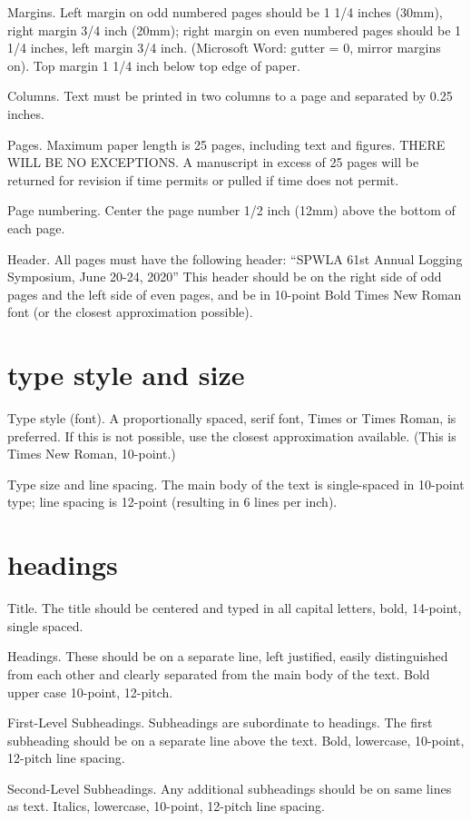 \documentclass[10pt,twocolumn,twoside]{article}
\begin{document}
Margins. Left margin on odd numbered pages should be 1 1/4 inches (30mm), right margin 3/4 inch (20mm); right margin on even numbered pages should be 1 1/4 inches, left margin 3/4 inch. (Microsoft Word: gutter = 0, mirror margins on). Top margin 1 1/4 inch below top edge of paper.

Columns. Text must be printed in two columns to a page and separated by 0.25 inches. 

Pages. Maximum paper length is 25 pages, including text and figures. THERE WILL BE NO EXCEPTIONS. A manuscript in excess of 25 pages will be returned for revision if time permits or pulled if time does not permit.

Page numbering. Center the page number 1/2 inch (12mm) above the bottom of each page.

Header. All pages must have the following header: “SPWLA 61st Annual Logging Symposium, June 20-24, 2020” This header should be on the right side of odd pages and the left side of even pages, and be in 10-point Bold Times New Roman font (or the closest approximation possible).

\section{type style and size}
Type style (font). A proportionally spaced, serif font, Times or Times Roman, is preferred. If this is not possible, use the closest approximation available. (This is Times New Roman, 10-point.)

Type size and line spacing. The main body of the text is single-spaced in 10-point type; line spacing is 12-point (resulting in 6 lines per inch).

\section{headings}

Title. The title should be centered and typed in all capital letters, bold, 14-point, single spaced.

Headings. These should be on a separate line, left justified, easily distinguished from each other and clearly separated from the main body of the text. Bold upper case 10-point, 12-pitch.

First-Level Subheadings. Subheadings are subordinate to headings. The first subheading should be on a separate line above the text. Bold, lowercase, 10-point, 12-pitch line spacing.

Second-Level Subheadings. Any additional subheadings should be on same lines as text. Italics, lowercase, 10-point, 12-pitch line spacing.
\end{document}
